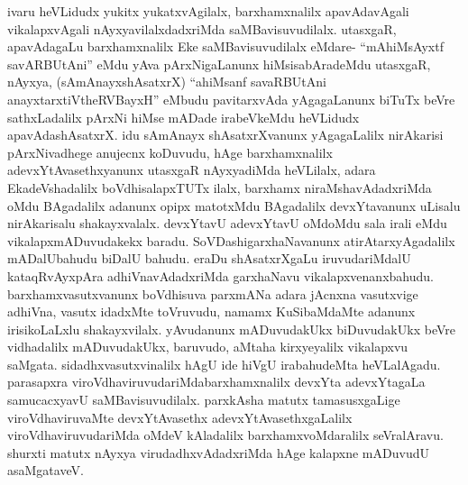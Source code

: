 \begin{artha}
ivaru heVLidudx yukitx yukatxvAgilalx, barxhamxnalilx apavAdavAgali vikalapxvAgali nAyxyavilalxdadxriMda saMBavisuvudilalx. utasxgaR, apavAdagaLu barxhamxnalilx Eke saMBavisuvudilalx eMdare- ``mAhiMsAyxtf savARBUtAni'' eMdu yAva pArxNigaLanunx hiMsisabAradeMdu utasxgaR, nAyxya, (sAmAnayxshAsatxrX) ``ahiMsanf savaRBUtAni anayxtarxtiVtheRVBayxH'' eMbudu pavitarxvAda yAgagaLanunx biTuTx beVre sathxLadalilx pArxNi hiMse mADade irabeVkeMdu heVLidudx apavAdashAsatxrX. idu sAmAnayx shAsatxrXvanunx yAgagaLalilx nirAkarisi pArxNivadhege anujecnx koDuvudu, hAge barxhamxnalilx adevxYtAvasethxyanunx utasxgaR nAyxyadiMda heVLilalx, adara EkadeVshadalilx boVdhisalapxTUTx ilalx, barxhamx niraMshavAdadxriMda oMdu BAgadalilx adanunx opipx matotxMdu BAgadalilx devxYtavanunx uLisalu nirAkarisalu shakayxvalalx. devxYtavU adevxYtavU oMdoMdu sala irali eMdu vikalapxmADuvudakekx baradu. SoVDashigarxhaNavanunx atirAtarxyAgadalilx mADalUbahudu biDalU bahudu. eraDu shAsatxrXgaLu iruvudariMdalU kataqRvAyxpAra adhiVnavAdadxriMda garxhaNavu vikalapxvenanxbahudu. barxhamxvasutxvanunx boVdhisuva parxmANa adara jAcnxna vasutxvige adhiVna, vasutx idadxMte toVruvudu, namamx KuSibaMdaMte adanunx irisikoLaLxlu shakayxvilalx. yAvudanunx mADuvudakUkx biDuvudakUkx beVre vidhadalilx mADuvudakUkx, baruvudo, aMtaha kirxyeyalilx vikalapxvu saMgata. sidadhxvasutxvinalilx hAgU ide hiVgU irabahudeMta heVLalAgadu. parasapxra viroVdhaviruvudariMda\break barxhamxnalilx devxYta adevxYtagaLa samucacxyavU saMBavisuvudilalx. parxkAsha matutx tamasusxgaLige viroVdhaviruvaMte devxYtAvasethx adevxYtAvasethxgaLalilx viroVdhaviruvudariMda oMdeV kAladalilx barxhamxvoMdaralilx seVralAravu. shurxti matutx nAyxya virudadhxvAdadxriMda hAge kalapxne mADuvudU asaMgataveV.
\end{artha}

